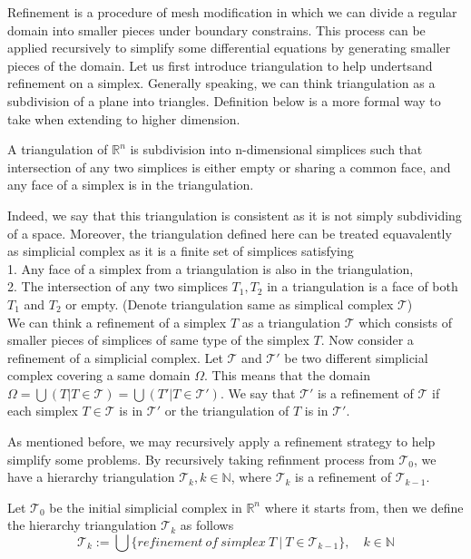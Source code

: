 Refinement is a procedure of mesh modification in which we can divide a regular domain into smaller pieces under boundary constrains. This process can be applied recursively to simplify some differential equations by generating smaller pieces of the domain. Let us first introduce triangulation to help undertsand refinement on a simplex. Generally speaking, we can think triangulation as a subdivision of a plane into triangles. Definition below is a more formal way to take when extending to higher dimension.
    \begin{definition*}
    A triangulation of $\mathbb R^n$ is subdivision into n-dimensional simplices such that intersection of any two simplices is either empty or sharing a common face, and any face of a simplex is in the triangulation.
    \end{definition*}
    Indeed, we say that this triangulation is consistent as it is not simply subdividing of a space. Moreover, the triangulation defined here can be treated equavalently as simplicial complex as it is a finite set of simplices satisfying\\
    1. Any face of a simplex from a triangulation is also in the triangulation,\\
    2. The intersection of any two simplices ${T}_1, {T}_2 $ in a triangulation is a face of both ${T}_1$ and  ${T}_2$ or empty.
    (Denote triangulation same as simplical complex $\mathcal{T}$)\\
    

    We can think a refinement of a simplex $T$ as a triangulation $\mathcal{T}$ which consists of smaller pieces of simplices of same type of the simplex $T$. Now consider a refinement of a simplicial complex. Let $\mathcal{T}$ and $\mathcal{T'}$ be two different simplicial complex covering a same domain $\Omega$. This means that the domain \(\Omega = \displaystyle \bigcup({T \vert T\in \mathcal{T}}) = \bigcup({T' \vert T\in \mathcal{T'}})\). We say that $\mathcal{T'}$ is a refinement of $\mathcal{T}$ if each simplex $T\in\mathcal{T}$ is in $\mathcal{T'}$ or the triangulation of $T$ is in $\mathcal{T'}$.

    As mentioned before, we may recursively apply a refinement strategy to help simplify some problems. By recursively taking refinment process from $\mathcal{T}_0$, we have a hierarchy triangulation $\mathcal{T}_k, k\in\mathbb{N}$, where $\mathcal{T}_k$ is a refinement of $\mathcal{T}_{k-1}$. 
    \begin{definition*}
    Let $\mathcal{T}_0$ be the initial simplicial complex in $\mathbb{R}^n$ where it starts from, then we define the hierarchy triangulation $\mathcal{T}_k$ as follows
    \begin{equation*}
    \mathcal{T}_k := \bigcup\{refinement~of~simplex~T ~\vert ~T\in\mathcal{T}_{k-1}\}, \quad k\in\mathbb{N}
    \end{equation*}
    \end{definition*}

